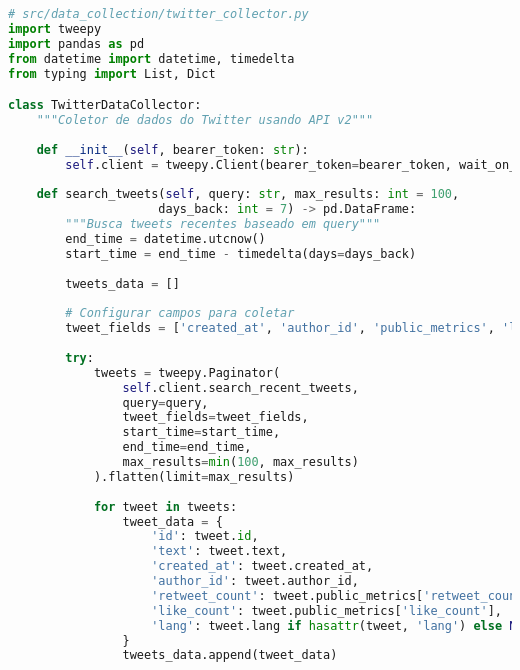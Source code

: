 \begin{pythonbox}
\begin{lstlisting}[language=Python]
# src/data_collection/twitter_collector.py
import tweepy
import pandas as pd
from datetime import datetime, timedelta
from typing import List, Dict

class TwitterDataCollector:
    """Coletor de dados do Twitter usando API v2"""
    
    def __init__(self, bearer_token: str):
        self.client = tweepy.Client(bearer_token=bearer_token, wait_on_rate_limit=True)
        
    def search_tweets(self, query: str, max_results: int = 100, 
                     days_back: int = 7) -> pd.DataFrame:
        """Busca tweets recentes baseado em query"""
        end_time = datetime.utcnow()
        start_time = end_time - timedelta(days=days_back)
        
        tweets_data = []
        
        # Configurar campos para coletar
        tweet_fields = ['created_at', 'author_id', 'public_metrics', 'lang']
        
        try:
            tweets = tweepy.Paginator(
                self.client.search_recent_tweets,
                query=query,
                tweet_fields=tweet_fields,
                start_time=start_time,
                end_time=end_time,
                max_results=min(100, max_results)
            ).flatten(limit=max_results)
            
            for tweet in tweets:
                tweet_data = {
                    'id': tweet.id,
                    'text': tweet.text,
                    'created_at': tweet.created_at,
                    'author_id': tweet.author_id,
                    'retweet_count': tweet.public_metrics['retweet_count'],
                    'like_count': tweet.public_metrics['like_count'],
                    'lang': tweet.lang if hasattr(tweet, 'lang') else None
                }
                tweets_data.append(tweet_data)
\end{lstlisting}
\end{pythonbox}

